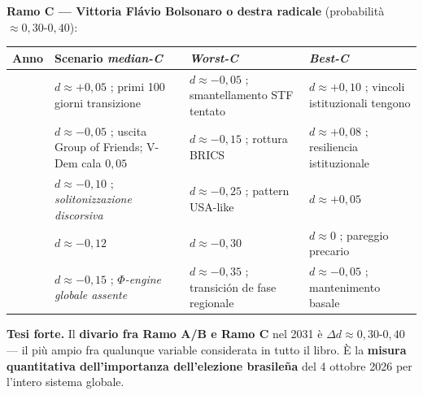 \textbf{Ramo C --- Vittoria Flávio Bolsonaro o destra radicale}
(probabilità \(\approx 0{,}30\)-\(0{,}40\)):

{\def\LTcaptype{none} %
{\small\begin{longtable}[]{@{}
  >{\raggedright\arraybackslash}p{}
  >{\raggedright\arraybackslash}p{}
  >{\raggedright\arraybackslash}p{}
  >{\raggedright\arraybackslash}p{}@{}}
\toprule\noalign{}
\begin{minipage}[b]{\linewidth}\raggedright
Anno
\end{minipage} & \begin{minipage}[b]{\linewidth}\raggedright
Scenario \emph{median-C}
\end{minipage} & \begin{minipage}[b]{\linewidth}\raggedright
\emph{Worst-C}
\end{minipage} & \begin{minipage}[b]{\linewidth}\raggedright
\emph{Best-C}
\end{minipage} \\
\midrule\noalign{}
\endhead
\bottomrule\noalign{}
\endlastfoot
2027 & \(d \approx +0{,}05\) ; primi 100 giorni transizione &
\(d \approx -0{,}05\) ; smantellamento STF tentato &
\(d \approx +0{,}10\) ; vincoli istituzionali tengono \\
2028 & \(d \approx -0{,}05\) ; uscita Group of Friends; V-Dem cala
\(0{,}05\) & \(d \approx -0{,}15\) ; rottura BRICS &
\(d \approx +0{,}08\) ; resiliencia istituzionale \\
2029 & \(d \approx -0{,}10\) ; \emph{solitonizzazione discorsiva} &
\(d \approx -0{,}25\) ; pattern USA-like & \(d \approx +0{,}05\) \\
2030 & \(d \approx -0{,}12\) & \(d \approx -0{,}30\) & \(d \approx 0\) ;
pareggio precario \\
2031 & \(d \approx -0{,}15\) ; \emph{$\Phi$-engine globale assente} &
\(d \approx -0{,}35\) ; transición de fase regionale &
\(d \approx -0{,}05\) ; mantenimento basale \\
\end{longtable}}
}

\Hypoth{} \textbf{Tesi forte.} Il \textbf{divario fra Ramo A/B e Ramo C}
nel 2031 è \(\Delta d \approx 0{,}30\)-\(0{,}40\) --- il più ampio fra
qualunque variable considerata in tutto il libro. È la \textbf{misura
quantitativa dell'importanza dell'elezione brasileña} del 4 ottobre
2026 per l'intero sistema globale.



